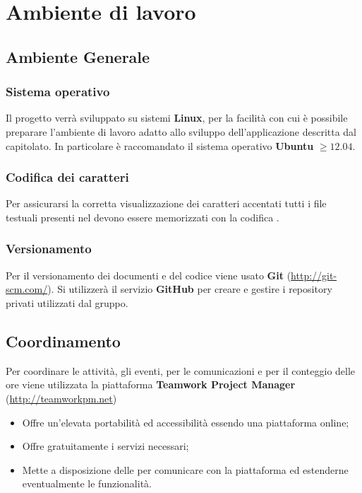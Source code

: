 \section{Ambiente di lavoro}
	
	\subsection{Ambiente Generale}
		
		\subsubsection{Sistema operativo}
		
		Il progetto verrà sviluppato su sistemi \textbf{Linux}, per la facilità con cui è possibile preparare l'ambiente di lavoro adatto allo sviluppo dell'applicazione descritta dal capitolato. In particolare è raccomandato il sistema operativo \textbf{Ubuntu} $\geq 12.04$.
		
		\subsubsection{Codifica dei caratteri}
		
		Per assicurarsi la corretta visualizzazione dei caratteri accentati tutti i file testuali presenti nel  devono essere memorizzati con la codifica \textbf{}.
		
		\subsubsection{Versionamento}
		
		Per il versionamento dei documenti e del codice viene usato \textbf{Git} (\url{http://git-scm.com/}).
		Si utilizzerà il servizio \textbf{GitHub} per creare e gestire i repository privati utilizzati dal gruppo.
		
	\subsection{Coordinamento}
	\label{teamworkpm}
	
		Per coordinare le attività, gli eventi, per le comunicazioni e per il conteggio delle ore viene utilizzata la piattaforma \textbf{Teamwork Project Manager} (\url{http://teamworkpm.net})
		\begin{itemize}
			\item Offre un'elevata portabilità ed accessibilità essendo una piattaforma online;
			\item Offre gratuitamente i servizi necessari;
			\item Mette a disposizione delle  per comunicare con la piattaforma ed estenderne eventualmente le funzionalità.
		\end{itemize}
		
